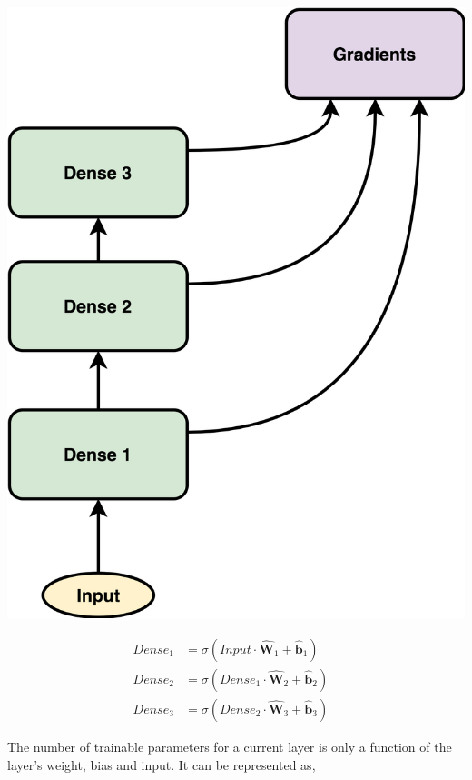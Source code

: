 \documentclass{article}
\let\oldhat\hat
\renewcommand{\hat}[1]{\oldhat{\mathbf{#1}}}
\begin{document}
\noindent\begin{minipage}{.45\textwidth}
   \centering
   \includegraphics[scale=0.09]{SimpleFFN.png}
   \label{fig:SimpleFFN.png}
\end{minipage}
\begin{minipage}{.45\textwidth}
\begin{equation}
\label{eq:1}
\begin{aligned}
   Dense_{1} &= \sigma(Input \cdot \hat{W}_{1} + \hat{b}_{1}) &\\
   Dense_{2} &= \sigma(Dense_{1} \cdot \hat{W}_{2} + \hat{b}_{2}) &\\
   Dense_{3} &= \sigma(Dense_{2} \cdot \hat{W}_{3} + \hat{b}_{3}) 
\end{aligned}
\end{equation}
\end{minipage}

The number of trainable parameters for a current layer is only a function of the layer's weight, bias and input. It can be represented as, 
\end{document}
